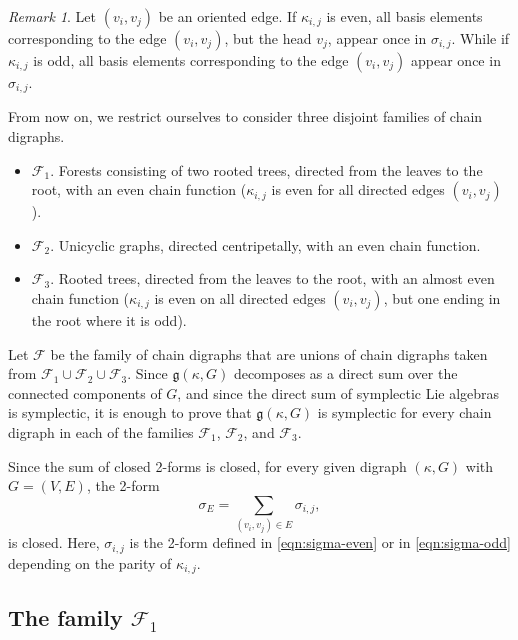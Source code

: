 \documentclass[a4paper,11pt]{amsart}
\theoremstyle{definition}
\theoremstyle{remark}
\newtheorem{remark}[theorem]{Remark}
\numberwithin{equation}{section}
\newcommand{\g}{\mathfrak{g}}
\newcommand{\F}{\mathcal{F}}
\begin{document}
\begin{remark}\label{rmk:sigmaij}
Let $(v_i,v_j)$ be an oriented edge.
If $\kappa_{i,j}$ is even, all basis elements corresponding to the edge \((v_i,v_j)\), but the head $v_j$, appear once in $\sigma_{i,j}$. 
While if $\kappa_{i,j}$ is odd, all basis elements corresponding to the edge \((v_i,v_j)\) appear once in $\sigma_{i,j}$. 
\end{remark}

\medskip

From now on, we restrict ourselves to consider three disjoint families of chain digraphs.
\begin{itemize}
    \item $\F_1$. Forests consisting of two rooted trees, directed from the leaves to the root, with an even chain function
                ($\kappa_{i,j}$ is even for all directed edges $(v_i,v_j)$).
    \item $\F_2$. Unicyclic graphs, directed centripetally, with an even chain function.
    \item $\F_3$. Rooted trees, directed from the leaves to the root, with an almost even chain function
                 ($\kappa_{i,j}$ is even on all directed edges $(v_i,v_j)$, but one ending in the root where it is odd).
\end{itemize}

\medskip

Let \(\F\) be the family of chain digraphs that are unions of chain digraphs taken from \(\F_1\cup\F_2\cup\F_3\). Since \(\g(\kappa,G)\) decomposes as a direct sum over the connected components of \(G\), and since the direct sum of symplectic Lie algebras is symplectic, it is enough to prove that \(\g(\kappa,G)\) is symplectic for every chain digraph in each of the families \(\F_1\), \(\F_2\), and \(\F_3\).

\medskip

Since the sum of closed 2-forms is closed, for every given digraph $(\kappa,G)$ with $G=(V,E)$,
the 2-form
\begin{equation}\label{eqn:sigmaE}
\sigma_E = \sum_{(v_i,v_j)\in E} \sigma_{i,j},
\end{equation}
is closed. Here, $\sigma_{i,j}$ is the 2-form defined in \eqref{eqn:sigma-even} or in \eqref{eqn:sigma-odd}
depending on the parity of $\kappa_{i,j}$.


\subsection{The family $\F_1$}
\end{document}
